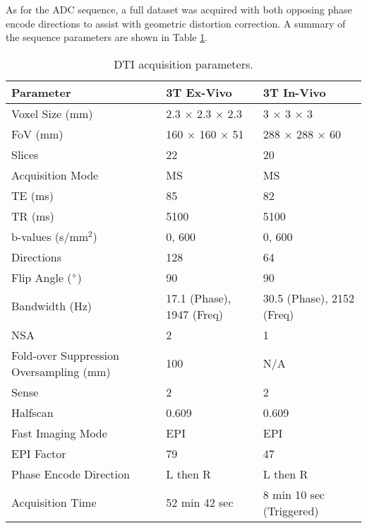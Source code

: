 As for the \ac{ADC} sequence, a full dataset was acquired with both opposing phase encode directions to assist with geometric distortion correction. A summary of the sequence parameters are shown in Table \ref{tab:ex_dti_mapping}. 

\begin{table}[H]
	\centering
	\begin{tabularx}{1.0\textwidth}{X|X|X}
		\textbf{Parameter}                      & \textbf{3T Ex-Vivo} & \textbf{3T In-Vivo}      \\ \hline
		Voxel Size (mm)                         & 2.3 $\times$ 2.3 $\times$ 2.3     & 3 $\times$ 3 $\times$ 3                \\ \hline
		FoV (mm)                                & 160 $\times$ 160 $\times$ 51      & 288 $\times$ 288 $\times$ 60           \\ \hline
		Slices                                  & 22                  & 20                       \\ \hline
		Acquisition Mode                        & MS                  & MS                       \\ \hline
		TE (ms)                                 & 85                  & 82                       \\ \hline
		TR (ms)                                 & 5100                & 5100                     \\ \hline
		b-values (s/mm$^2$)                     & 0, 600              & 0, 600                   \\ \hline
		Directions                              & 128                 & 64                       \\ \hline
		Flip Angle ($\degree$)                  & 90                  & 90                       \\ \hline
		Bandwidth (Hz)                          & 17.1 (Phase), 1947 (Freq)               & 30.5 (Phase), 2152 (Freq)                    \\ \hline
		NSA                                     & 2                   & 1                        \\ \hline
		Fold-over Suppression Oversampling (mm) & 100                 & N/A                      \\ \hline
		Sense                                   & 2                   & 2                        \\ \hline
		Halfscan                                & 0.609               & 0.609                    \\ \hline
		Fast Imaging Mode                       & EPI                 & EPI                      \\ \hline
		EPI Factor                              & 79                  & 47                       \\ \hline
		Phase Encode Direction                  & L then R            & L then R                 \\ \hline
		Acquisition Time                        & 52 min 42 sec       & 8 min 10 sec (Triggered)
	\end{tabularx}
	\caption{\ac{DTI} acquisition parameters.}
	\label{tab:ex_dti_mapping}
\end{table}

